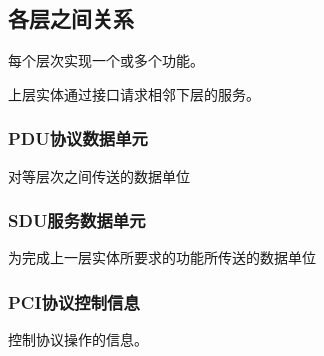\subsection{各层之间关系}

每个层次实现一个或多个功能。

上层实体通过接口请求相邻下层的服务。

\subsubsection{PDU协议数据单元}
对等层次之间传送的数据单位


\subsubsection{SDU服务数据单元}
为完成上一层实体所要求的功能所传送的数据单位


\subsubsection{PCI协议控制信息}
控制协议操作的信息。

